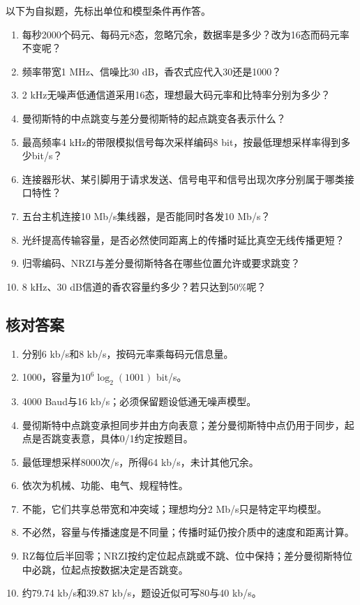 以下为自拟题，先标出单位和模型条件再作答。

\begin{enumerate}
\def\labelenumi{\arabic{enumi}.}
\item
  每秒2000个码元、每码元8态，忽略冗余，数据率是多少？改为16态而码元率不变呢？
\item
  频率带宽1 MHz、信噪比30 dB，香农式应代入30还是1000？
\item
  2 kHz无噪声低通信道采用16态，理想最大码元率和比特率分别为多少？
\item
  曼彻斯特的中点跳变与差分曼彻斯特的起点跳变各表示什么？
\item
  最高频率4 kHz的带限模拟信号每次采样编码8 bit，按最低理想采样率得到多少bit/s？
\item
  连接器形状、某引脚用于请求发送、信号电平和信号出现次序分别属于哪类接口特性？
\item
  五台主机连接10 Mb/s集线器，是否能同时各发10 Mb/s？
\item
  光纤提高传输容量，是否必然使同距离上的传播时延比真空无线传播更短？
\item
  归零编码、NRZI与差分曼彻斯特各在哪些位置允许或要求跳变？
\item
  8 kHz、30 dB信道的香农容量约多少？若只达到50\%呢？
\end{enumerate}

\subsection{核对答案}\label{CN02-review-answers}

\begin{enumerate}
\def\labelenumi{\arabic{enumi}.}
\item
  分别6 kb/s和8 kb/s，按码元率乘每码元信息量。
\item
  1000，容量为\(10^6\log_2(1001)\) bit/s。
\item
  4000 Baud与16 kb/s；必须保留题设低通无噪声模型。
\item
  曼彻斯特中点跳变承担同步并由方向表意；差分曼彻斯特中点仍用于同步，起点是否跳变表意，具体0/1约定按题目。
\item
  最低理想采样8000次/s，所得64 kb/s，未计其他冗余。
\item
  依次为机械、功能、电气、规程特性。
\item
  不能，它们共享总带宽和冲突域；理想均分2 Mb/s只是特定平均模型。
\item
  不必然，容量与传播速度是不同量；传播时延仍按介质中的速度和距离计算。
\item
  RZ每位后半回零；NRZI按约定位起点跳或不跳、位中保持；差分曼彻斯特位中必跳，位起点按数据决定是否跳变。
\item
  约79.74 kb/s和39.87 kb/s，题设近似可写80与40 kb/s。
\end{enumerate}
